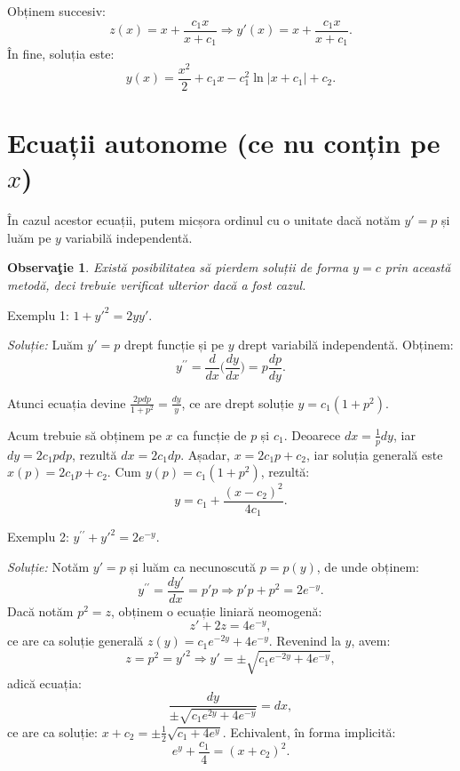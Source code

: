 \documentclass[11pt,a4paper]{article}
\theoremstyle{dotless}
\theoremstyle{dotlessdr}
\newtheorem{remark}{Observa\c{t}ie}[section]
\begin{document}
Obținem succesiv:
\[
  z(x) = x + \frac{c_1 x}{x + c_1} \Rightarrow y'(x) = x + \frac{c_1 x}{x + c_1}.
\]
În fine, soluția este:
\[
  y(x) = \frac{x^2}{2} + c_1 x - c_1^2 \ln|x + c_1| + c_2.
\]


\section{Ecuații autonome (ce nu conțin pe $x$)}

În cazul acestor ecuații, putem micșora ordinul cu o unitate dacă notăm $y' = p$
și luăm pe $y$ variabilă independentă.

\begin{remark}\label{rk:autonom-pierd}
  Există posibilitatea să pierdem soluții de forma $y = c$ prin această metodă,
  deci trebuie verificat ulterior dacă a fost cazul.
\end{remark}

Exemplu 1: $1 + {y'}^2 = 2yy'$.

\emph{Soluție:} Luăm $y' = p$ drept funcție și pe $y$ drept variabilă independentă.
Obținem:
\[
  y^{\prime\prime} = \frac{d}{dx} \big( \frac{dy}{dx} \big) = p \frac{dp}{dy}.
\]

Atunci ecuația devine $\frac{2pdp}{1 + p^2} = \frac{dy}{y}$, ce are drept soluție
$y = c_1(1 + p^2)$.

Acum trebuie să obținem pe $x$ ca funcție de $p$ și $c_1$. Deoarece $dx = \frac{1}{p}dy$,
iar $dy = 2c_1 pdp$, rezultă $dx = 2c_1 dp$. Așadar, $x = 2c_1 p + c_2$, iar soluția
generală este $x(p) = 2c_1 p + c_2$. Cum $y(p) = c_1(1 + p^2)$, rezultă:
\[
  y = c_1 + \frac{(x - c_2)^2}{4c_1}.
\]

\vspace{1cm}

Exemplu 2: $y^{\prime\prime} + {y'}^2 = 2e^{-y}$.

\emph{Soluție:} Notăm $y' = p$ și luăm ca necunoscută $p = p(y)$,
de unde obținem:
\[
  y^{\prime\prime} = \frac{dy'}{dx} = p'p \Rightarrow p'p + p^2 = 2e^{-y}.
\]
Dacă notăm $p^2 = z$, obținem o ecuație liniară neomogenă:
\[
  z' + 2z = 4e^{-y},
\]
ce are ca soluție generală $z(y) = c_1 e^{-2y} + 4e^{-y}$. Revenind la $y$,
avem:
\[
  z = p^2 = {y'}^2 \Rightarrow y' = \pm \sqrt{c_1 e^{-2y} + 4e^{-y}},
\]
adică ecuația:
\[
  \frac{dy}{\pm\sqrt{c_1 e^{2y} + 4e^{-y}}} = dx,
\]
ce are ca soluție: $x + c_2 = \pm \frac{1}{2} \sqrt{c_1 + 4e^y}$. Echivalent, în forma
implicită:
\[
  e^y + \frac{c_1}{4} = (x + c_2)^2.
\]
\end{document}
